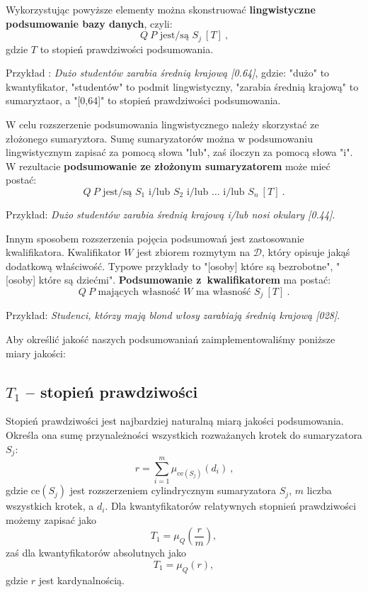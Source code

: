 \documentclass{classrep}
\begin{document}
\vspace\baselineskip

Wykorzystując powyższe elementy można skonstruować \textbf{lingwistyczne podsumowanie
bazy danych}, czyli:
\[Q ~ P \mbox{ jest/są } S_j ~[T] ~\mbox{,}\]
gdzie \(T\) to stopień prawdziwości podsumowania.

\vspace\baselineskip

Przykład : \emph{Dużo studentów zarabia średnią krajową [0.64]}, gdzie: "dużo" to kwantyfikator, "studentów" to podmit lingwistyczny, "zarabia średnią krajową" to sumaryztaor, a "[0,64]" to stopień prawdziwości podsumowania. \newline

W celu rozszerzenie podsumowania lingwistycznego należy skorzystać ze złożonego sumaryztora. Sumę sumaryzatorów można w podsumowaniu lingwistycznym zapisać
za pomocą słowa "lub", zaś iloczyn za pomocą słowa "i".
W rezultacie \textbf{podsumowanie ze złożonym sumaryzatorem} może
mieć postać:
\[Q ~ P \mbox{ jest/są } S_1 \mbox{ i/lub } S_2 \mbox{ i/lub } \ldots \mbox{ i/lub } S_n  ~[T] ~\mbox{.}\]

\vspace\baselineskip

Przykład: \emph{Dużo studentów zarabia średnią krajową i/lub nosi okulary [0.44]}. \newline

Innym sposobem rozszerzenia pojęcia podsumowań
jest zastosowanie kwalifikatora. Kwalifikator
\(W\) jest zbiorem rozmytym na \(\mathcal{D}\),
który opisuje jakąś dodatkową właściwość. Typowe przykłady to "[osoby] które są bezrobotne",
"[osoby] które są dziećmi". \textbf{Podsumowanie
z~kwalifikatorem} ma postać:
\[Q ~ P \mbox{ mających własność } W \mbox{ ma własność } S_j ~[T] ~\mbox{.}\]

\vspace\baselineskip

Przykład: \emph{Studenci, którzy mają blond włosy zarabiają średnią krajową [028]}.\newline

Aby określić jakość naszych podsumowaniań zaimplementowaliśmy poniższe miary jakości:

\subsection{\(T_1\) -- stopień prawdziwości}

Stopień prawdziwości jest najbardziej naturalną miarą jakości podsumowania. Określa ona sumę przynależności wszystkich rozważanych krotek do sumaryzatora \(S_j\):
\[r = \sum_{i=1}^{m} \mu_{\mathrm{ce}(S_j)}(d_i) ~\mbox{,}\]
gdzie \(\mathrm{ce}(S_j)\) jest rozszerzeniem cylindrycznym
sumaryzatora \(S_j\), \(m\) liczba wszystkich krotek, a \(d_i\).
Dla kwantyfikatorów relatywnych stopnień
prawdziwości możemy zapisać jako
$$T_1 = \mu_Q(\frac{r}{m}),$$
zaś dla kwantyfikatorów absolutnych jako
$$T_1 = \mu_Q(r),$$
gdzie \(r\) jest kardynalnością. 
\end{document}
